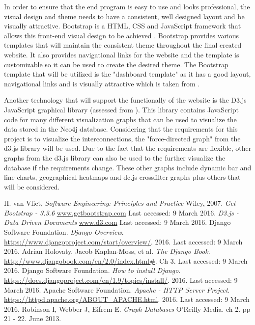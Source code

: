 \documentclass[10pt,onecolumn]{article}
\begin{document}
In order to ensure that the end program is easy to use and looks professional, the visual design and theme needs to have a consistent, well designed layout and be visually attractive. Bootstrap is a HTML, CSS and JavaScript framework that allows this front-end visual design to be achieved \cite{Bootstrap}. Bootstrap provides various templates that will maintain the consistent theme throughout the final created website. It also provides navigational links for the website and the template is customizable so it can be used to create the desired theme. The Bootstrap template that will be utilized is the "dashboard template" as it has a good layout, navigational links and is visually attractive which is taken from \cite{Bootstrap}.

Another technology that will support the functionally of the website is the D3.js JavaScript graphical library (assessed from \cite{D3}). This library contains JavaScript code for many different visualization graphs that can be used to visualize the data stored in the Neo4j database. Considering that the requirements for this project is to visualize the interconnections, the "force-directed graph" from the d3.js library will be used. Due to the fact that the requirements are flexible, other graphs from the d3.js library can also be used to the further visualize the database if the requirements change. These other graphs include dynamic bar and line charts, geographical heatmaps and dc.js crossfilter graphs plus others that will be considered. 

\begin{thebibliography}{1}
 H. van Vliet, \emph{Software Engineering: Principles and Practice} Wiley, 2007.
  \emph{Get Bootstrap - 3.3.6} \url{www.getbootstrap.com} Last accessed: 9 March 2016.
  \emph{D3.js - Data Driven Documents} \url{www.d3.com} Last accessed: 9 March 2016.
 Django Software Foundation. \emph{Django Overview}. \url{https://www.djangoproject.com/start/overview/}. 2016. Last accessed: 9 March 2016. 
 Adrian Holovaty, Jacob Kaplan-Moss, et al. \emph{The Django Book}. \url{http://www.djangobook.com/en/2.0/index.html#}. Ch 3. Last accessed: 9 March 2016.
 Django Software Foundation. \emph{How to install Django}. \url{https://docs.djangoproject.com/en/1.9/topics/install/}. 2016. Last accessed: 9 March 2016.	
 Apache Software Foundation. \emph{Apache - HTTP Server Project}. \url{https://httpd.apache.org/ABOUT_APACHE.html}. 2016. Last accessed: 9 March 2016.	
 Robinson I, Webber J, Eifrem E. \emph{Graph Databases} O'Reilly Media. ch 2. pp 21 - 22. June 2013.


\end{thebibliography}

\clearpage
\end{document}

